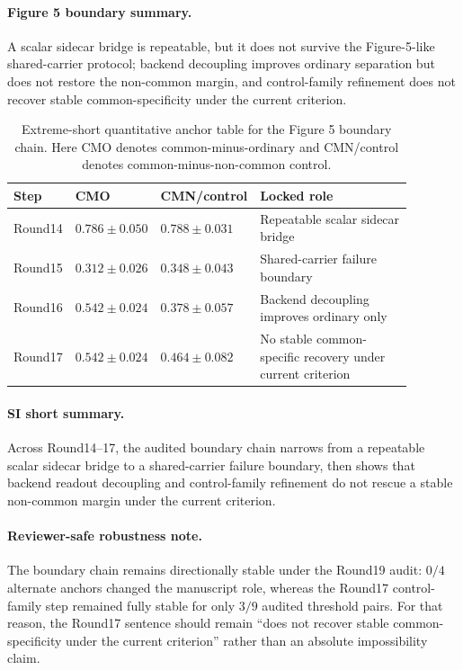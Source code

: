 
\paragraph{Figure 5 boundary summary.}
A scalar sidecar bridge is repeatable, but it does not survive the Figure-5-like shared-carrier protocol; backend decoupling improves ordinary separation but does not restore the non-common margin, and control-family refinement does not recover stable common-specificity under the current criterion.

\begin{table}[t]
\centering
\small
\setlength{\tabcolsep}{4pt}
\begin{tabular}{p{0.10\linewidth}p{0.18\linewidth}p{0.18\linewidth}p{0.42\linewidth}}
\hline
Step & CMO & CMN/control & Locked role \\
\hline
Round14 & $0.786 \pm 0.050$ & $0.788 \pm 0.031$ & Repeatable scalar sidecar bridge \\
Round15 & $0.312 \pm 0.026$ & $0.348 \pm 0.043$ & Shared-carrier failure boundary \\
Round16 & $0.542 \pm 0.024$ & $0.378 \pm 0.057$ & Backend decoupling improves ordinary only \\
Round17 & $0.542 \pm 0.024$ & $0.464 \pm 0.082$ & No stable common-specific recovery under current criterion \\
\hline
\end{tabular}
\caption{Extreme-short quantitative anchor table for the Figure 5 boundary chain. Here CMO denotes common-minus-ordinary and CMN/control denotes common-minus-non-common control.}
\end{table}

\paragraph{SI short summary.}
Across Round14--17, the audited boundary chain narrows from a repeatable scalar sidecar bridge to a shared-carrier failure boundary, then shows that backend readout decoupling and control-family refinement do not rescue a stable non-common margin under the current criterion.

\paragraph{Reviewer-safe robustness note.}
The boundary chain remains directionally stable under the Round19 audit: $0/4$ alternate anchors changed the manuscript role, whereas the Round17 control-family step remained fully stable for only $3/9$ audited threshold pairs. For that reason, the Round17 sentence should remain ``does not recover stable common-specificity under the current criterion'' rather than an absolute impossibility claim.
